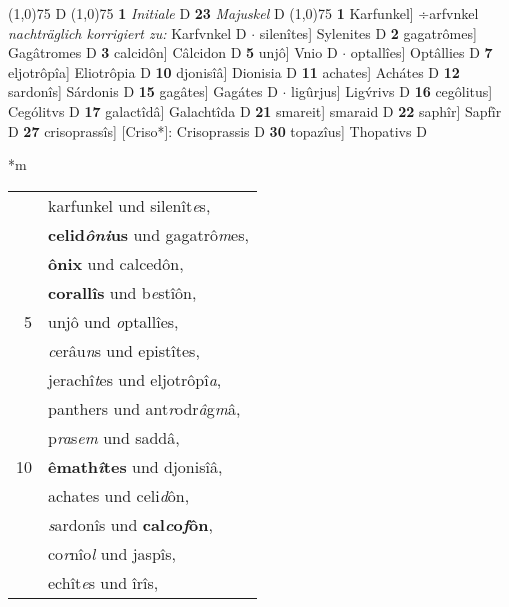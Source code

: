 \documentclass[8pt,a4paper,notitlepage]{article}
\begin{document}
\begin{table}[ht]
\begin{minipage}[t]{0.5\linewidth}
\scriptsize
\line(1,0){75} \newline
D \newline
\line(1,0){75} \newline
\textbf{1} \textit{Initiale} D  \textbf{23} \textit{Majuskel} D  \newline
\line(1,0){75} \newline
\textbf{1} Karfunkel] ÷arfvnkel \textit{nachträglich korrigiert zu:} Karfvnkel D  $\cdot$ silenîtes] Sylenites D \textbf{2} gagatrômes] Gagâtromes D \textbf{3} calcidôn] Câlcidon D \textbf{5} unjô] Vnio D  $\cdot$ optallîes] Optâllies D \textbf{7} eljotrôpîa] Eliotrôpia D \textbf{10} djonisîâ] Dionisia D \textbf{11} achates] Achátes D \textbf{12} sardonîs] Sárdonis D \textbf{15} gagâtes] Gagátes D  $\cdot$ ligûrjus] Ligv́rivs D \textbf{16} cegôlitus] Cególitvs D \textbf{17} galactîdâ] Galachtîda D \textbf{21} smareit] smaraid D \textbf{22} saphîr] Sapfîr D \textbf{27} crisoprassîs] [Criso*]: Crisoprassis D \textbf{30} topazîus] Thopativs D \newline
\end{minipage}
\hspace{0.5cm}
\begin{minipage}[t]{0.5\linewidth}
\small
\begin{center}*m
\end{center}
\begin{tabular}{rl}
 & karfunkel und silenît\textit{e}s,\\ 
 & \textbf{celid\textit{ôni}us} und gagatrô\textit{m}es,\\ 
 & \textbf{ônix} und calcedôn,\\ 
 & \textbf{corallîs} und b\textit{e}stîôn,\\ 
5 & unjô und \textit{o}ptallîes,\\ 
 & \textit{c}erâu\textit{n}s und epistîtes,\\ 
 & jerachî\textit{t}es und eljotrôpî\textit{a},\\ 
 & panthers und ant\textit{r}odr\textit{â}g\textit{m}â,\\ 
 & p\textit{ra}s\textit{em} und saddâ,\\ 
10 & \textbf{êmath\textit{î}tes} und djonisîâ,\\ 
 & achates und celi\textit{d}ôn,\\ 
 & \textit{s}ardonîs und \textbf{cal\textit{c}o\textit{f}ôn},\\ 
 & co\textit{r}nîo\textit{l} und jaspîs,\\ 
 & echît\textit{e}s und îrîs,\\ 

\end{tabular}
\end{minipage}
\end{table}
\end{document}
